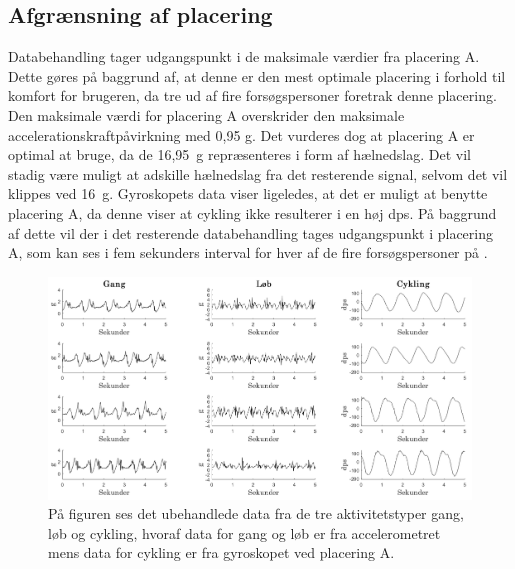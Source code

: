 \subsection{Afgrænsning af placering}
Databehandling tager udgangspunkt i de maksimale værdier fra placering A. Dette gøres på baggrund af, at denne er den mest optimale placering i forhold til komfort for brugeren, da tre ud af fire forsøgspersoner foretrak denne placering. Den maksimale værdi for placering A overskrider den maksimale accelerationskraftpåvirkning med 0,95 g. Det vurderes dog at placering A er optimal at bruge, da de 16,95~g repræsenteres i form af hælnedslag. Det vil stadig være muligt at adskille hælnedslag fra det resterende signal, selvom det vil klippes ved 16~g. \newline
Gyroskopets data viser ligeledes, at det er muligt at benytte placering A, da denne viser at cykling ikke resulterer i en høj dps. På baggrund af dette vil der i det resterende databehandling tages udgangspunkt i placering A, som kan ses i fem sekunders interval for hver af de fire forsøgspersoner på .
\begin{figure}[H]
	\centering
	\includegraphics[width=1\textwidth]{figures/qBilag/raa_data}
	\caption{På figuren ses det ubehandlede data fra de tre aktivitetstyper gang, løb og cykling, hvoraf data for gang og løb er fra accelerometret mens data for cykling er fra gyroskopet ved placering A.}
	\label{raa_data}
\end{figure}\vspace{-.25cm}

